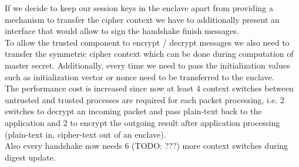 \documentclass[../main.tex]{subfiles}
\begin{document}
\noindent
If we decide to keep our session keys in the enclave apart from
providing a mechanism to transfer the cipher context we have to
additionally present an interface that would allow to sign the
handshake finish messages.\\

\noindent
To allow the trusted component to encrypt / decrypt messages we also
need to transfer the symmetric cipher context which can be done during
computation of master secret. Additionally, every time we need to pass
the initialization values such as initialization vector or nonce need
to be transferred to the enclave.\\

\noindent
The performance cost is increased since now at least 4 context
switches between untrusted and trusted processes are required for each
packet processing, i.e. 2 switches to decrypt an incoming packet and
pass plain-text back to the application and 2 to encrypt the outgoing
result after application processing (plain-text in, cipher-text out of
an enclave).\\

\noindent
Also every handshake now needs 6 (TODO: ???) more context switches
during digest update.


\end{document}
